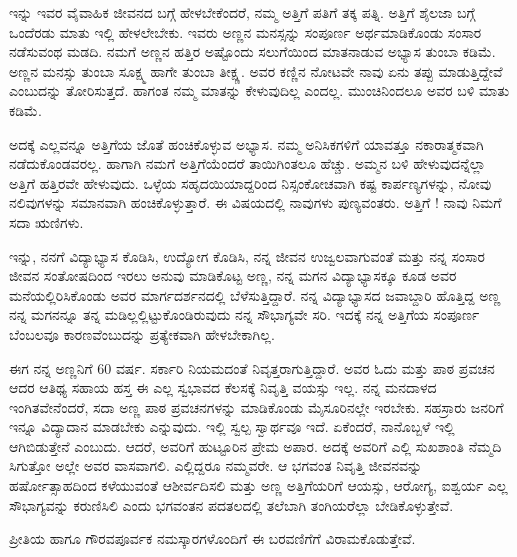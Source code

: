 {ಇನ್ನು ಇವರ ವೈವಾಹಿಕ ಜೀವನದ ಬಗ್ಗೆ ಹೇಳಬೇಕೆಂದರೆ, ನಮ್ಮ ಅತ್ತಿಗೆ ಪತಿಗೆ ತಕ್ಕ ಪತ್ನಿ. ಅತ್ತಿಗೆ   \enginline{-}   ಶೈಲಜಾ ಬಗ್ಗೆ ಒಂದೆರಡು ಮಾತು ಇಲ್ಲಿ ಹೇಳಲೇಬೇಕು. ಇವರು ಅಣ್ಣನ ಮನಸ್ಸನ್ನು ಸಂಪೂರ್ಣ ಅರ್ಥಮಾಡಿಕೊಂಡು ಸಂಸಾರ ನಡೆಸುವಂಥ ಮಡದಿ.  ನಮಗೆ ಅಣ್ಣನ ಹತ್ತಿರ ಅಷ್ಟೊಂದು ಸಲುಗೆಯಿಂದ ಮಾತನಾಡುವ ಅಭ್ಯಾಸ ತುಂಬಾ ಕಡಿಮೆ. ಅಣ್ಣನ ಮನಸ್ಸು ತುಂಬಾ ಸೂಕ್ಷ್ಮ ಹಾಗೇ ತುಂಬಾ ತೀಕ್ಷ್ಣ. ಅವರ ಕಣ್ಣಿನ ನೋಟವೇ ನಾವು ಏನು ತಪ್ಪು ಮಾಡುತ್ತಿದ್ದೇವೆ ಎಂಬುದನ್ನು ತೋರಿಸುತ್ತದೆ. ಹಾಗಂತ ನಮ್ಮ ಮಾತನ್ನು ಕೇಳುವುದಿಲ್ಲ ಎಂದಲ್ಲ. ಮುಂಚಿನಿಂದಲೂ ಅವರ ಬಳಿ ಮಾತು ಕಡಿಮೆ.

ಅದಕ್ಕೆ ಎಲ್ಲವನ್ನೂ ಅತ್ತಿಗೆಯ ಜೊತೆ ಹಂಚಿಕೊಳ್ಳುವ ಅಭ್ಯಾಸ. ನಮ್ಮ ಅನಿಸಿಕಗಳಿಗೆ ಯಾವತ್ತೂ ನಕಾರಾತ್ಮಕವಾಗಿ ನಡೆದುಕೊಂಡವರಲ್ಲ.  ಹಾಗಾಗಿ ನಮಗೆ ಅತ್ತಿಗೆಯೆಂದರೆ ತಾಯಿಗಿಂತಲೂ ಹೆಚ್ಚು.  ಅಮ್ಮನ ಬಳಿ ಹೇಳುವುದನ್ನೆಲ್ಲಾ ಅತ್ತಿಗೆ ಹತ್ತಿರವೇ ಹೇಳುವುದು. ಒಳ್ಳೆಯ ಸಹೃದಯಿಯಾದ್ದರಿಂದ ನಿಸ್ಸಂಕೋಚವಾಗಿ ಕಷ್ಟ ಕಾರ್ಪಣ್ಯಗಳನ್ನು, ನೋವು ನಲಿವುಗಳನ್ನು ಸಮಾನವಾಗಿ ಹಂಚಿಕೊಳ್ಳುತ್ತಾರೆ. ಈ ವಿಷಯದಲ್ಲಿ ನಾವುಗಳು ಪುಣ್ಯವಂತರು. ಅತ್ತಿಗೆ ! ನಾವು ನಿಮಗೆ ಸದಾ ಋಣಿಗಳು.

ಇನ್ನು, ನನಗೆ ವಿದ್ಯಾಭ್ಯಾಸ ಕೊಡಿಸಿ, ಉದ್ಯೋಗ ಕೊಡಿಸಿ, ನನ್ನ ಜೀವನ ಉಜ್ವಲವಾಗುವಂತೆ ಮತ್ತು ನನ್ನ ಸಂಸಾರ ಜೀವನ ಸಂತೋಷದಿಂದ ಇರಲು ಅನುವು ಮಾಡಿಕೊಟ್ಟ ಅಣ್ಣ, ನನ್ನ ಮಗನ ವಿದ್ಯಾಭ್ಯಾಸಕ್ಕೂ ಕೂಡ ಅವರ ಮನೆಯಲ್ಲಿರಿಸಿಕೊಂಡು ಅವರ ಮಾರ್ಗದರ್ಶನದಲ್ಲಿ ಬೆಳೆಸುತ್ತಿದ್ದಾರೆ.  ನನ್ನ ವಿದ್ಯಾಭ್ಯಾಸದ ಜವಾಬ್ದಾರಿ ಹೊತ್ತಿದ್ದ ಅಣ್ಣ  ನನ್ನ ಮಗನನ್ನೂ ತನ್ನ ಮಡಿಲ್ಲಲ್ಲಿಟ್ಟುಕೊಂಡಿರುವುದು ನನ್ನ ಸೌಭಾಗ್ಯವೇ ಸರಿ. ಇದಕ್ಕೆ ನನ್ನ ಅತ್ತಿಗೆಯ ಸಂಪೂರ್ಣ ಬೆಂಬಲವೂ ಕಾರಣವೆಂಬುದನ್ನು ಪ್ರತ್ಯೇಕವಾಗಿ ಹೇಳಬೇಕಾಗಿಲ್ಲ. 

ಈಗ ನನ್ನ ಅಣ್ಣನಿಗೆ 60 ವರ್ಷ. ಸರ್ಕಾರಿ ನಿಯಮದಂತೆ ನಿವೃತ್ತರಾಗುತ್ತಿದ್ದಾರೆ. ಅವರ ಓದು ಮತ್ತು ಪಾಠ  \enginline{-}  ಪ್ರವಚನ ಆದರ  \enginline{-}  ಆತಿಥ್ಯ ಸಹಾಯ ಹಸ್ತ ಈ ಎಲ್ಲ ಸ್ವಭಾವದ ಕೆಲಸಕ್ಕೆ ನಿವೃತ್ತಿ ವಯಸ್ಸು ಇಲ್ಲ.  ನನ್ನ ಮನದಾಳದ ಇಂಗಿತವೇನೆಂದರೆ, ಸದಾ ಅಣ್ಣ ಪಾಠ  \enginline{-}  ಪ್ರವಚನಗಳನ್ನು ಮಾಡಿಕೊಂಡು ಮೈಸೂರಿನಲ್ಲೇ ಇರಬೇಕು.  ಸಹಸ್ರಾರು ಜನರಿಗೆ ಇನ್ನೂ ವಿದ್ಯಾದಾನ ಮಾಡಬೇಕು ಎನ್ನುವುದು.  ಇಲ್ಲಿ ಸ್ವಲ್ಪ ಸ್ವಾರ್ಥವೂ ಇದೆ. ಏಕೆಂದರೆ, ನಾನೊಬ್ಬಳೆ ಇಲ್ಲಿ ಆಗಿಬಿಡುತ್ತೇನೆ ಎಂಬುದು.  ಆದರೆ, ಅವರಿಗೆ ಹುಟ್ಟೂರಿನ ಪ್ರೇಮ ಅಪಾರ.  ಅದಕ್ಕೆ ಅವರಿಗೆ ಎಲ್ಲಿ ಸುಖಶಾಂತಿ ನೆಮ್ಮದಿ ಸಿಗುತ್ತೋ ಅಲ್ಲೇ ಅವರ ವಾಸವಾಗಲಿ. ಎಲ್ಲಿದ್ದರೂ ನಮ್ಮವರೇ.  ಆ ಭಗವಂತ  ನಿವೃತ್ತಿ ಜೀವನವನ್ನು ಹರ್ಷೋತ್ಸಾಹದಿಂದ ಕಳೆಯುವಂತೆ ಆಶೀರ್ವದಿಸಲಿ ಮತ್ತು ಅಣ್ಣ ಅತ್ತಿಗೆಯರಿಗೆ ಆಯಸ್ಸು, ಆರೋಗ್ಯ, ಐಶ್ವರ್ಯ ಎಲ್ಲ ಸೌಭಾಗ್ಯವನ್ನು  ಕರುಣಿಸಿಲಿ ಎಂದು ಭಗವಂತನ ಪದತಲದಲ್ಲಿ ತಲೆಬಾಗಿ ತಂಗಿಯರೆಲ್ಲಾ ಬೇಡಿಕೊಳ್ಳುತ್ತೇವೆ.

ಪ್ರೀತಿಯ ಹಾಗೂ ಗೌರವಪೂರ್ವಕ ನಮಸ್ಕಾರಗಳೊಂದಿಗೆ ಈ ಬರವಣಿಗೆಗೆ ವಿರಾಮಕೊಡುತ್ತೇವೆ.

\articleend
}
